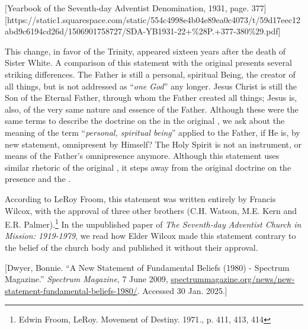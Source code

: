 [Yearbook of the Seventh-day Adventist Denomination, 1931, page. 377][https://static1.squarespace.com/static/554c4998e4b04e89ea0c4073/t/59d17eec12abd9c6194cd26d/1506901758727/SDA-YB1931-22+\%28P.+377-380\%29.pdf]

This change, in favor of the Trinity, appeared sixteen years after the death of Sister White. A comparison of this statement with the original  presents several striking differences. The Father is still a personal, spiritual Being, the creator of all things, but is not addressed as “\textit{one God}” any longer. Jesus Christ is still the Son of the Eternal Father, through whom the Father created all things; Jesus is, also, of the very same nature and essence of the Father. Although these were the same terms to describe the doctrine on the  in the original , we ask about the meaning of the term “\textit{personal, spiritual being}” applied to the Father, if He is, by new statement, omnipresent by Himself? The Holy Spirit is not an instrument, or means of the Father’s omnipresence anymore. Although this statement uses similar rhetoric of the original , it steps away from the original doctrine on the presence and the .

According to LeRoy Froom, this statement was written entirely by Francis Wilcox, with the approval of three other brothers (C.H. Watson, M.E. Kern and E.R. Palmer).\footnote{Edwin Froom, LeRoy. Movement of Destiny. 1971., p. 411, 413, 414} In the unpublished paper of \textit{The Seventh-day Adventist Church in Mission: 1919-1979}, we read how Elder Wilcox made this statement contrary to the belief of the church body and published it without their approval. 

[Dwyer, Bonnie. “A New Statement of Fundamental Beliefs (1980) - Spectrum Magazine.” \textit{Spectrum Magazine}, 7 June 2009, \href{https://spectrummagazine.org/news/new-statement-fundamental-beliefs-1980/}{spectrummagazine.org/news/new-statement-fundamental-beliefs-1980/}. Accessed 30 Jan. 2025.]

